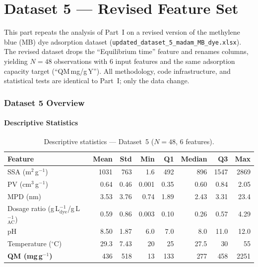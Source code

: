 \documentclass[12pt,a4paper]{article}
\begin{document}
\newpage
\part{Dataset 5 — Revised Feature Set}

This part repeats the analysis of Part~I on a revised version of the
methylene blue (MB) dye adsorption dataset
(\texttt{updated\_dataset\_5\_madam\_MB\_dye.xlsx}).  The revised dataset
drops the ``Equilibrium time'' feature and renames columns, yielding
$N=48$ observations with 6 input features and the same adsorption
capacity target (``QM\,mg/g\,Y'').  All methodology, code infrastructure,
and statistical tests are identical to Part~I; only the data change.

\section{Dataset 5 Overview}
\label{sec:ds5_dataset}

\subsection{Descriptive Statistics}

\begin{table}[h]
\centering
\caption{Descriptive statistics — Dataset~5 ($N=48$, 6 features).}
\label{tab:ds5_descriptive}
\small
\begin{tabular}{lrrrrrrr}
\toprule
Feature & Mean & Std & Min & Q1 & Median & Q3 & Max \\
\midrule
SSA (m$^2$\,g$^{-1}$)            & 1031 & 763  & 1.6   & 492   & 896  & 1547 & 2869 \\
PV (cm$^3$\,g$^{-1}$)            & 0.64 & 0.46 & 0.001 & 0.35  & 0.60 & 0.84 & 2.05 \\
MPD (nm)                          & 3.53 & 3.76 & 0.74  & 1.89  & 2.43 & 3.31 & 23.4 \\
Dosage ratio (g\,L$_\text{dye}^{-1}$/g\,L$_\text{AC}^{-1}$)
                                  & 0.59 & 0.86 & 0.003 & 0.10  & 0.26 & 0.57 & 4.29 \\
pH                                & 8.50 & 1.87 & 6.0   & 7.0   & 8.0  & 11.0 & 12.0 \\
Temperature ($^\circ$C)           & 29.3 & 7.43 & 20    & 25    & 27.5 & 30   & 55   \\
\midrule
\textbf{QM (mg\,g$^{-1}$)}       & 436  & 518  & 13    & 133   & 277  & 458  & 2251 \\
\bottomrule
\end{tabular}
\end{table}
\end{document}
